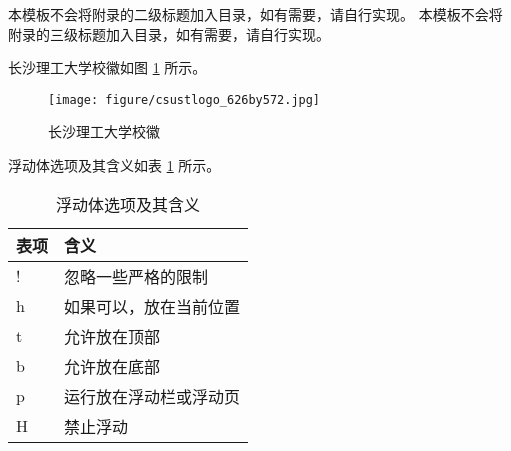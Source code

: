 \appendix  %

本模板不会将附录的二级标题加入目录，如有需要，请自行实现。
本模板不会将附录的三级标题加入目录，如有需要，请自行实现。

长沙理工大学校徽如图 \ref{fig:appendix:csustlogo} 所示。  %

\begin{figure}[htbp]  %
  \centering  %
  \texttt{[image: figure/csustlogo\_626by572.jpg]}  %
  \caption{长沙理工大学校徽}  %
  \label{fig:appendix:csustlogo}  %
\end{figure}

浮动体选项及其含义如表 \ref{tab:appendix:floatchoice} 所示。

\begin{table}[htbp]
  \centering  %
  \caption{浮动体选项及其含义}
  \begin{tabular}[]{ll}
      \toprule   %
      表项      & 含义            \\
      \midrule   %
        !       &  忽略一些严格的限制   \\
        h       &  如果可以，放在当前位置   \\
        t       &  允许放在顶部   \\
        b       &  允许放在底部  \\
        p       &  运行放在浮动栏或浮动页   \\
        H       &  禁止浮动   \\
      \bottomrule   %
  \end{tabular}
  \label{tab:appendix:floatchoice}  %
\end{table}





\listoffigures

\listoftables